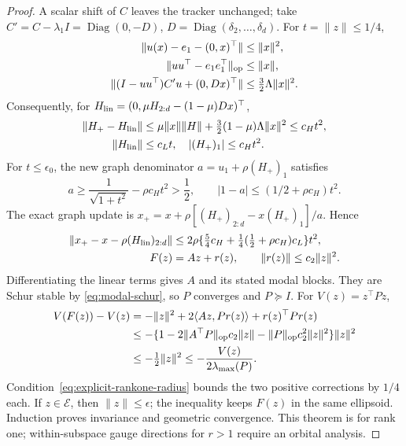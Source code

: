\begin{proof}
A scalar shift of $C$ leaves the tracker unchanged; take
$C'=C-\lambda_1I=\operatorname{Diag}(0,-D)$,
$D=\operatorname{Diag}(\delta_2,\ldots,\delta_d)$.
For $t=\|z\|\le1/4$,
\begin{align}
 \|u(x)-e_1-(0,x)^\top\|&\le\|x\|^2,\\
 \|uu^\top-e_1e_1^\top\|_{\rm op}&\le\|x\|,\\
 \|(I-uu^\top)C'u+(0,Dx)^\top\|
 &\le\tfrac32\Lambda\|x\|^2.
\end{align}
Consequently, for $H_{\rm lin}=(0,\mu H_{2:d}-(1-\mu)Dx)^\top$,
\begin{align}
 \|H_+-H_{\rm lin}\|
 &\le\mu\|x\|\|H\|+\tfrac32(1-\mu)\Lambda\|x\|^2
 \le c_Ht^2,\\
 \|H_{\rm lin}\|&\le c_Lt,\quad |(H_+)_1|\le c_Ht^2.
\end{align}
For $t\le\epsilon_0$, the new graph denominator
$a=u_1+\rho(H_+)_1$ satisfies
\begin{equation}
 a\ge\frac1{\sqrt{1+t^2}}-\rho c_Ht^2>\frac12,\qquad
 |1-a|\le(1/2+\rho c_H)t^2.
\end{equation}
The exact graph update is
$x_+=x+\rho[(H_+)_{2:d}-x(H_+)_1]/a$. Hence
\begin{align}
 \|x_+-x-\rho(H_{\rm lin})_{2:d}\|
 &\le2\rho\{\tfrac54c_H+
                \tfrac14(\tfrac12+\rho c_H)c_L\}t^2,\\
 F(z)&=Az+r(z),\qquad\|r(z)\|\le c_2\|z\|^2.
\end{align}
Differentiating the linear terms gives $A$ and its stated modal blocks.
They are Schur stable by \eqref{eq:modal-schur}, so $P$ converges and
$P\succeq I$. For $V(z)=z^\top Pz$,
\begin{align}
 V(F(z))-V(z)
 &=-\|z\|^2+2\langle Az,Pr(z)\rangle+r(z)^\top Pr(z)\\
 &\le-\{1-2\|A^\top P\|_{\rm op}c_2\|z\|
                -\|P\|_{\rm op}c_2^2\|z\|^2\}\|z\|^2\\
 &\le-\tfrac12\|z\|^2
 \le-\frac{V(z)}{2\lambda_{\max}(P)}.
\end{align}
Condition~\eqref{eq:explicit-rankone-radius} bounds the two positive
corrections by $1/4$ each. If $z\in\mathcal E$, then $\|z\|\le\epsilon$;
the inequality keeps $F(z)$ in the same ellipsoid. Induction proves
invariance and geometric convergence. This theorem is for rank one;
within-subspace gauge directions for $r>1$ require an orbital analysis.
\end{proof}
